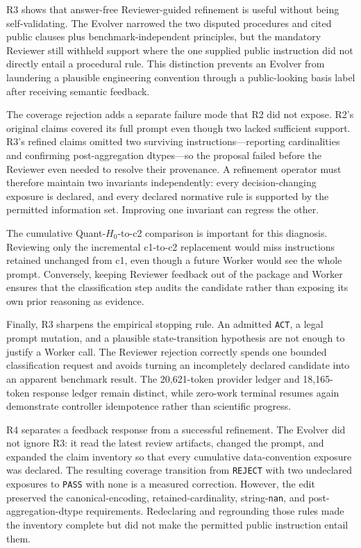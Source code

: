 R3 shows that answer-free Reviewer-guided refinement is useful without being
self-validating. The Evolver narrowed the two disputed procedures and cited
public clauses plus benchmark-independent principles, but the mandatory
Reviewer still withheld support where the one supplied public instruction did
not directly entail a procedural rule. This distinction prevents an Evolver
from laundering a plausible engineering convention through a public-looking
basis label after receiving semantic feedback.

The coverage rejection adds a separate failure mode that R2 did not expose.
R2's original claims covered its full prompt even though two lacked sufficient
support. R3's refined claims omitted two surviving instructions---reporting
cardinalities and confirming post-aggregation dtypes---so the proposal failed
before the Reviewer even needed to resolve their provenance. A refinement
operator must therefore maintain two invariants independently: every
decision-changing exposure is declared, and every declared normative rule is
supported by the permitted information set. Improving one invariant can
regress the other.

The cumulative Quant-$H_0$-to-c2 comparison is important for this diagnosis.
Reviewing only the incremental c1-to-c2 replacement would miss instructions
retained unchanged from c1, even though a future Worker would see the whole
prompt. Conversely, keeping Reviewer feedback out of the package and Worker
ensures that the classification step audits the candidate rather than exposing
its own prior reasoning as evidence.

Finally, R3 sharpens the empirical stopping rule. An admitted \texttt{ACT}, a
legal prompt mutation, and a plausible state-transition hypothesis are not
enough to justify a Worker call. The Reviewer rejection correctly spends one
bounded classification request and avoids turning an incompletely declared
candidate into an apparent benchmark result. The 20,621-token provider ledger
and 18,165-token response ledger remain distinct, while zero-work terminal
resumes again demonstrate controller idempotence rather than scientific
progress.

R4 separates a feedback response from a successful refinement. The Evolver did
not ignore R3: it read the latest review artifacts, changed the prompt, and
expanded the claim inventory so that every cumulative data-convention exposure
was declared. The resulting coverage transition from \texttt{REJECT} with two
undeclared exposures to \texttt{PASS} with none is a measured correction.
However, the edit preserved the canonical-encoding, retained-cardinality,
string-\texttt{nan}, and post-aggregation-dtype requirements. Redeclaring and
regrounding those rules made the inventory complete but did not make the
permitted public instruction entail them.

